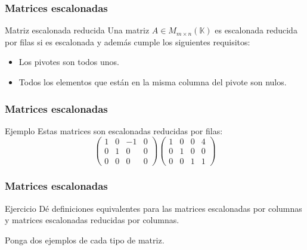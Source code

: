\documentclass[aspectratio=169]{beamer}
\begin{document}
 \begin{frame}
  \frametitle{Matrices escalonadas}

 \begin{block}{Matriz escalonada reducida}
Una matriz $A\in M_{m\times n}(\mathbb{K})$ es escalonada  reducida por filas si es escalonada y adem\'as cumple los siguientes requisitos:
\begin{itemize}
\item Los pivotes son todos unos.
\item Todos los elementos que est\'an en la misma columna del pivote son nulos.
\end{itemize}
\end{block}
\end{frame} 



 \begin{frame}
  \frametitle{Matrices escalonadas}

 \begin{block}{Ejemplo}
Estas matrices son escalonadas reducidas por filas:
\[
\left(\begin{array}{cccc}1 & 0 & -1 & 0 \\0 & 1 & 0 & 0 \\0 & 0 & 0 & 0\end{array}\right)
\left(\begin{array}{cccc}1 & 0 & 0 & 4 \\0 & 1 & 0 & 0 \\0 & 0 & 1 & 1\end{array}\right)
\]
\end{block}
\end{frame} 



 \begin{frame}
  \frametitle{Matrices escalonadas}

 \begin{block}{Ejercicio}
 D\'e definiciones equivalentes para las matrices escalonadas por columnas y matrices escalonadas reducidas por columnas.

Ponga dos ejemplos de cada tipo de matriz.
 

\end{block}
\end{frame} 
\end{document}
